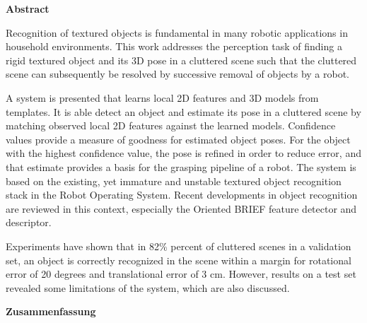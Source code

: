 

\clearemptydoublepage
{}
{}	

\vspace*{2cm}
\begin{center}
{\Large \bf Abstract}
\end{center}
\vspace{1cm}

Recognition of textured objects is fundamental in many robotic applications in
household environments. This work addresses the perception task of finding a
rigid textured object and its 3D pose in a cluttered scene such that the
cluttered scene can subsequently be resolved by successive removal of objects
by a robot.

A system is presented that learns local 2D features and 3D models from
templates. It is able detect an object and estimate its pose in a cluttered
scene by matching observed local 2D features against the learned models.
Confidence values provide a measure of goodness for estimated object poses. For
the object with the highest confidence value, the pose is refined in order to
reduce error, and that estimate provides a basis for the grasping pipeline of a
robot.  The system is based on the existing, yet immature and unstable textured
object recognition stack in the Robot Operating System. Recent developments in
object recognition are reviewed in this context, especially the Oriented BRIEF
feature detector and descriptor.

Experiments have shown that in 82\% percent of cluttered scenes in a validation
set, an object is correctly recognized in the scene within a margin for
rotational error of 20 degrees and translational error of 3 cm.  However,
results on a test set revealed some limitations of the system, which are also
discussed.

\clearemptydoublepage
{}
{}

\vspace*{2cm}
\begin{center}
{\Large \bf Zusammenfassung}
\end{center}
\vspace{1cm}


